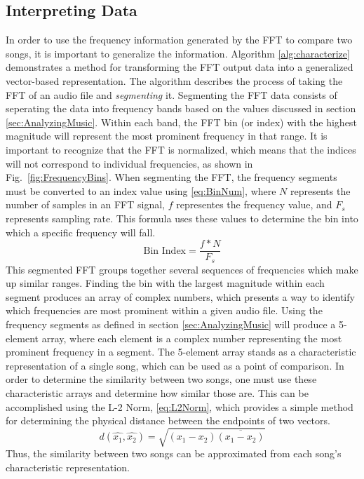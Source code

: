 \documentclass[conference]{IEEEtran}
\begin{document}
\subsection{Interpreting Data}\label{sec:interpreting}
In order to use the frequency information generated by the FFT to compare two songs, it is important to generalize the information. Algorithm \eqref{alg:characterize} demonstrates a method for transforming the FFT output data into a generalized vector-based representation. The algorithm describes the process of taking the FFT of an audio file and \textit{segmenting} it. Segmenting the FFT data consists of seperating the data into frequency bands based on the values discussed in section \eqref{sec:AnalyzingMusic}. Within each band, the FFT bin (or index) with the highest magnitude will represent the most prominent frequency in that range. It is important to recognize that the FFT is normalized, which means that the indices will not correspond to individual frequencies, as shown in Fig.~\eqref{fig:FrequencyBins}. When segmenting the FFT, the frequency segments must be converted to an index value using \eqref{eq:BinNum}, where $N$ represents the number of samples in an FFT signal, $f$ representes the frequency value, and $F_{s}$ represents sampling rate. This formula uses these values to determine the bin into which a specific frequency will fall.
\begin{equation}\label{eq:BinNum}
  \text{Bin Index}=\frac{f * N}{F_{s}}
\end{equation}
This segmented FFT groups together several sequences of frequencies which make up similar ranges. Finding the bin with the largest magnitude within each segment produces an array of complex numbers, which presents a way to identify which frequencies are most prominent within a given audio file. Using the frequency segments as defined in section \eqref{sec:AnalyzingMusic} will produce a 5-element array, where each element is a complex number representing the most prominent frequency in a segment. The 5-element array stands as a characteristic representation of a single song, which can be used as a point of comparison. In order to determine the similarity between two songs, one must use these characteristic arrays and determine how similar those are. This can be accomplished using the L-2 Norm, \eqref{eq:L2Norm}, which provides a simple method for determining the physical distance between the endpoints of two vectors.
\begin{equation}\label{eq:L2Norm}
  d(\hat{x_1},\hat{x_2})=\sqrt{(x_1-x_2)\overline{(x_1-x_2)}}
\end{equation}
Thus, the similarity between two songs can be approximated from each song's characteristic representation.
\end{document}
